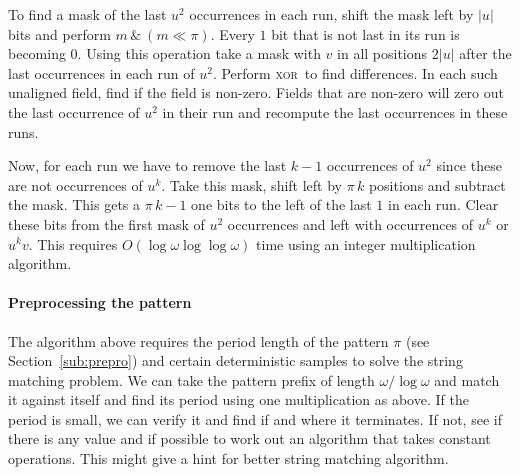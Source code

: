 \documentclass[12pt]{article}
\newcommand{\rem}[1]{{\marginpar{\raggedright\scriptsize #1}}}
\newcommand{\comment}[1]{}
\newcommand{\W}{{\omega}}
\newcommand{\C}{{\alpha}}
\newcommand{\xor}{\textsc{xor}}
\begin{document}
{ 

To find a mask of the last $u^2$ occurrences in each run,
shift the mask left by $|u|$ bits and perform  $m \, \& ~ (m\ll\pi)$.
Every $1$ bit that is not last in its run is becoming $0$.
Using this operation take a mask with $v$ in all positions $2|u|$
after the last occurrences in each run of $u^2$. Perform \xor\ to find
differences.  In each such unaligned field, find if the field is
non-zero.  Fields that are non-zero will zero out the last occurrence
of $u^2$ in their run and recompute the last occurrences in these
runs.

Now, for each run we have to remove the last $k-1$ occurrences of
$u^2$ since these are not occurrences of $u^k$.  Take this mask, shift
left by $\pi \, k$ positions and subtract the mask. This gets a $\pi
\, k-1$ one bits to the left of the last $1$ in each run. Clear these
bits from the first mask of $u^2$ occurrences and left with
occurrences of $u^k$ or $u^kv$. This requires $O(\log \W \log\log \W)$
time using an integer multiplication algorithm.

}






\comment{
\subsubsection{Sparsification via Two-Samples}\rem{not sure this is useful-remove if not}
There is always a sample of size $2$ the will get us this sparse.
See Crochemore Galil Gasienicec Park and Rytter. This is not complete yet.

Two sample to get $\log \pi$ sparsification.
Since the results are sparse, we could potentially get the fields
with the integer multiplication results in there.
But we only want the sparse output results, the inputs are not sparse.

Can this be combined with with section above perhaps to get constant time
with small words?
}


\paragraph{Preprocessing the pattern}

The algorithm above requires the period length of the pattern $\pi$
(see Section~\ref{sub:prepro}) and certain deterministic samples to solve
the string matching problem.
%
We can take the pattern prefix of length $\W/\log \W$
and match it against itself and find its period using
one multiplication as above.
If the period is small, we can verify it and find
if and where it terminates. If not, see if there
is any value and if possible to work out an algorithm
that takes constant operations. This might give a hint
for better string matching algorithm.
\end{document}

